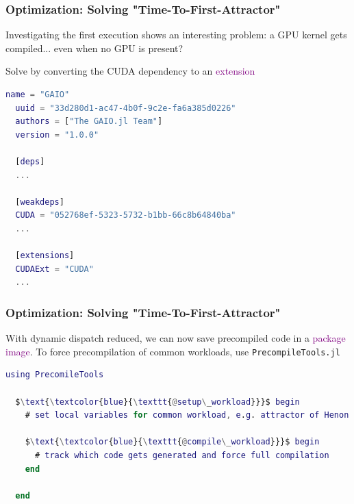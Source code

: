\documentclass[
  english,            %
  aspectratio=169,    %
]{tumbeamer}
\renewcommand{\emph}[1]{\textcolor{purple}{#1}}
\begin{document}
\begin{frame}[fragile]
\frametitle{Optimization: Solving "Time-To-First-Attractor"}
  
Investigating the first execution shows an interesting problem: a GPU kernel gets compiled... even when no GPU is present?

Solve by converting the CUDA dependency to an \emph{extension}

\begin{lstlisting}[language=Matlab,mathescape]
  name = "GAIO"
  uuid = "33d280d1-ac47-4b0f-9c2e-fa6a385d0226"
  authors = ["The GAIO.jl Team"]
  version = "1.0.0"

  [deps]
  ...

  [weakdeps]
  CUDA = "052768ef-5323-5732-b1bb-66c8b64840ba"
  ...

  [extensions]
  CUDAExt = "CUDA"
  ...
\end{lstlisting}

\end{frame}

\begin{frame}[fragile]
\frametitle{Optimization: Solving "Time-To-First-Attractor"}

With dynamic dispatch reduced, we can now save precompiled code in a \emph{package image}. To force precompilation of common workloads, use \texttt{PrecompileTools.jl}

\medskip

\begin{lstlisting}[language=Matlab,mathescape]
  using PrecomileTools

  $\text{\textcolor{blue}{\texttt{@setup\_workload}}}$ begin
    # set local variables for common workload, e.g. attractor of Henon map

    $\text{\textcolor{blue}{\texttt{@compile\_workload}}}$ begin
      # track which code gets generated and force full compilation
    end

  end
\end{lstlisting}

\end{frame}
\end{document}
